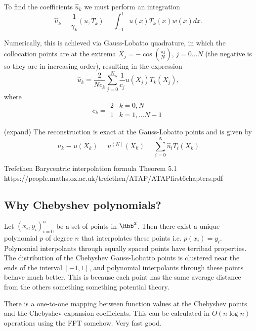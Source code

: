 To find the coefficients $\hat{u}_k$ we must perform an integration
\begin{equation} \hat{u}_k = \frac{1}{\gamma_k}(u,T_k)=\int_{-1}^1 u(x)T_k(x)w(x)dx. \end{equation}

Numerically, this is achieved via Gauss-Lobatto quadrature, in which the collocation points are at the extrema $X_j=-\cos (\frac{\pi j}{N})$, $j=0...N$ (the negative is so they are in increasing order), resulting in the expression
\begin{equation}\label{eq:ChebyCoeffsQuad} \hat{u}_k = \frac{2}{N c_k}\sum_{j=0}^N \frac{1}{c_j} u(X_j) T_k(X_j),\end{equation}
where
\begin{equation} c_k=\begin{array}{ll}
             2 & k=0,N \\
             1 & k=1,...N-1 
            \end{array} 
\end{equation}

(expand)
The reconstruction is exact at the Gauss-Lobatto points and is given by
\begin{equation}\label{eq:ChebyRecon} u_k \equiv u(X_k)=u^{(N)}(X_k)=\sum_{i=0}^N \hat{u}_i T_i(X_k) \end{equation}

Trefethen Barycentric interpolation formula Theorem 5.1
https://people.maths.ox.ac.uk/trefethen/ATAP/ATAPfirst6chapters.pdf

\subsection{Why Chebyshev polynomials?}
Let ${(x_i,y_i)}_{i=0}^{n}$ be a set of points in $\Rbb^2$. Then there exist a unique polynomial $p$ of degree $n$ that interpolates these points i.e. $p(x_i)=y_i$. Polynomial interpolants through equally spaced points have terribad properties. The distribution of the Chebyshev Gauss-Lobatto points is clustered near the ends of the interval $[-1,1]$, and polynomial interpolants through these points behave much better. This is because each point has the same average distance from the others something something potential theory.

There is a one-to-one mapping between function values at the Chebyshev points and the Chebyshev expansion coefficients. This can be calculated in $O(n \log n)$ operations using the FFT somehow. Very fast good.

